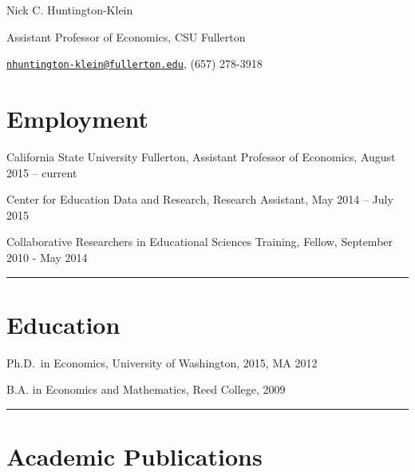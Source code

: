 \documentclass[11pt,a4paper]{article}
\begin{document}
Nick C. Huntington-Klein



Assistant Professor of Economics, CSU Fullerton



\href{mailto:nhuntington-klein@fullerton.edu}{\nolinkurl{nhuntington-klein@fullerton.edu}}, (657) 278-3918







\section*{Employment} 



California State University Fullerton, Assistant Professor of Economics, August 2015 -- current



Center for Education Data and Research, Research Assistant, May 2014 -- July 2015



Collaborative Researchers in Educational Sciences Training, Fellow, September 2010 - May 2014



\vspace{1cm} \hrule \vspace{1cm}





\section*{Education} 



Ph.D.~in Economics, University of Washington, 2015, MA 2012



B.A. in Economics and Mathematics, Reed College, 2009



\vspace{1cm} \hrule \vspace{1cm}





\section*{Academic Publications} 
\end{document}
